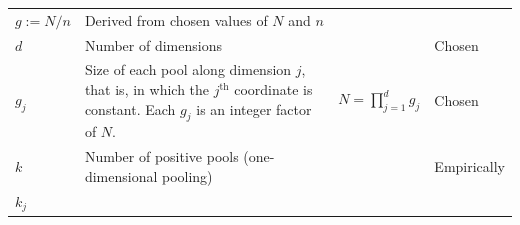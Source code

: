 \documentclass[letterpaper]{article}
\begin{document}
\begin{footnotesize}
\begin{longtable}[]{@{}llll@{}}
\begin{minipage}[t]{0.28\columnwidth}
	$g:=N/n$\strut
\end{minipage} & \begin{minipage}[t]{0.24\columnwidth}\raggedright
	Derived from chosen values of $N$ and $n$\strut
\end{minipage}\tabularnewline
\begin{minipage}[t]{0.08\columnwidth}\raggedright
	$d$\strut
\end{minipage} & \begin{minipage}[t]{0.28\columnwidth}\raggedright
	Number of dimensions\strut
\end{minipage} & \begin{minipage}[t]{0.28\columnwidth}\raggedright
	\strut
\end{minipage} & \begin{minipage}[t]{0.24\columnwidth}\raggedright
	Chosen\strut
\end{minipage}\tabularnewline
\begin{minipage}[t]{0.08\columnwidth}\raggedright
	$g_j$\strut
\end{minipage} & \begin{minipage}[t]{0.28\columnwidth}\raggedright
	Size of each pool along dimension $j$, that is, in which the
	$j^\text{th}$ coordinate is constant. Each $g_j$ is an integer
	factor of $N$.\strut
\end{minipage} & \begin{minipage}[t]{0.28\columnwidth}\raggedright
	$N=\prod_{j=1}^d g_j$\strut
\end{minipage} & \begin{minipage}[t]{0.24\columnwidth}\raggedright
	Chosen\strut
\end{minipage}\tabularnewline
\begin{minipage}[t]{0.08\columnwidth}\raggedright
	$k$\strut
\end{minipage} & \begin{minipage}[t]{0.28\columnwidth}\raggedright
	Number of positive pools (one-dimensional pooling)\strut
\end{minipage} & \begin{minipage}[t]{0.28\columnwidth}\raggedright
	\strut
\end{minipage} & \begin{minipage}[t]{0.24\columnwidth}\raggedright
	Empirically\strut
\end{minipage}\tabularnewline
\begin{minipage}[t]{0.08\columnwidth}\raggedright
	$k_j$\strut
\end{minipage} & \begin{minipage}[t]{0.28\columnwidth}\raggedright

\end{minipage}
\end{longtable}
\end{footnotesize}
\end{document}
